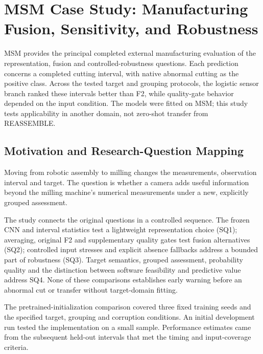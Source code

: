 \chapter{MSM Case Study: Manufacturing Fusion, Sensitivity, and Robustness}
\label{ch:msm}

MSM provides the principal completed external manufacturing evaluation of the
representation, fusion and controlled-robustness questions. Each prediction concerns a
completed cutting interval, with native abnormal cutting as the positive class. Across
the tested target and grouping protocols, the logistic sensor branch ranked these
intervals better than F2, while quality-gate behavior depended on the input condition.
The models were fitted on MSM; this study tests applicability in another domain, not
zero-shot transfer from REASSEMBLE.

\section{Motivation and Research-Question Mapping}
Moving from robotic assembly to milling changes the measurements, observation interval
and target. The question is whether a camera adds useful information beyond the milling
machine's numerical measurements under a new, explicitly grouped assessment.

The study connects the original questions in a controlled sequence. The frozen CNN and
interval statistics test a lightweight representation choice (SQ1); averaging, original
F2 and supplementary quality gates test fusion alternatives (SQ2); controlled input
stresses and explicit absence fallbacks address a bounded part of robustness (SQ3).
Target semantics, grouped assessment, probability quality and the distinction between
software feasibility and predictive value address SQ4. None of these comparisons
establishes early warning before an abnormal cut or transfer without target-domain
fitting.

The pretrained-initialization comparison covered three fixed training seeds and the
specified target, grouping and corruption conditions. An initial development run tested
the implementation on a small sample. Performance estimates came from the subsequent
held-out intervals that met the timing and input-coverage criteria.

